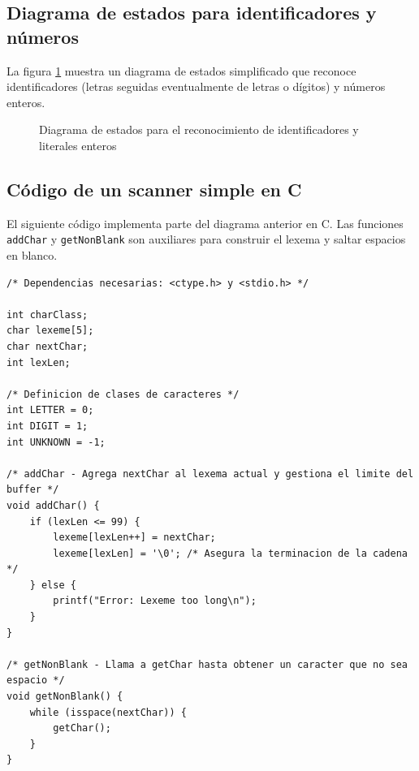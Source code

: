 \subsection{Diagrama de estados para identificadores y números}

La figura \ref{fig:state-diagram-id-number} muestra un diagrama de estados simplificado que reconoce identificadores (letras seguidas eventualmente de letras o dígitos) y números enteros.

\begin{figure}[htbp]
  \centering
  \caption{Diagrama de estados para el reconocimiento de identificadores y literales enteros }
  \label{fig:state-diagram-id-number}
\end{figure}

\subsection{Código de un scanner simple en C}

El siguiente código implementa parte del diagrama anterior en C. Las funciones \texttt{addChar} y \texttt{getNonBlank} son auxiliares para construir el lexema y saltar espacios en blanco.

\begin{lstlisting}[style=c, caption={Implementación parcial de un scanner en C para el reconocimiento de tokens}]
/* Dependencias necesarias: <ctype.h> y <stdio.h> */

int charClass;
char lexeme[5];
char nextChar;
int lexLen;

/* Definicion de clases de caracteres */
int LETTER = 0;
int DIGIT = 1;
int UNKNOWN = -1;

/* addChar - Agrega nextChar al lexema actual y gestiona el limite del buffer */
void addChar() {
    if (lexLen <= 99) {
        lexeme[lexLen++] = nextChar;
        lexeme[lexLen] = '\0'; /* Asegura la terminacion de la cadena */
    } else {
        printf("Error: Lexeme too long\n");
    }
}

/* getNonBlank - Llama a getChar hasta obtener un caracter que no sea espacio */
void getNonBlank() {
    while (isspace(nextChar)) {
        getChar();
    }
}
\end{lstlisting}



